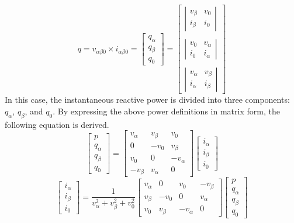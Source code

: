  \begin{equation}
 q=v_{\alpha \beta 0} \times i_{\alpha \beta 0} = \begin{bmatrix} q_\alpha \\ q_\beta \\ q_0 \end{bmatrix} =  \begin{bmatrix} \left| \begin{array}{cc} v_\beta & v_0 \\  i_\beta & i_0\end{array}\right| \\ \\ \left| \begin{array}{cc} v_0 & v_\alpha \\ i_0 & i_\alpha \end{array}\right| \\ \\ \left| \begin{array}{cc} v_\alpha & v_\beta \\ i_\alpha & i_\beta \end{array}\right| \end{bmatrix}
\label{eqn2.21}
\end{equation}
In this case, the instantaneous reactive power is divided into three components: $q_\alpha$, $q_\beta$, and $q_0$. By expressing the above power definitions in matrix form, the following equation is derived. 
 \begin{equation}
\begin{bmatrix} p \\q_\alpha  \\
q_{\beta} \\ q_0
\end{bmatrix} = \begin{bmatrix} v_\alpha & v_\beta & v_0 \\ 0 & -v_0 & v_\beta \\ v_0 & 0 & -v_\alpha \\ -v_\beta & v_\alpha & 0 
\end{bmatrix} \begin{bmatrix} i_\alpha \\ i_\beta \\ i_0
 \end{bmatrix}
\label{eqn2.22}
\end{equation}
 \begin{equation}
\begin{bmatrix} i_\alpha \\ i_\beta \\ i_0
\end{bmatrix}  = \frac{1}{v_\alpha^2 + v_\beta^2 + v_0^2} \begin{bmatrix} v_\alpha & 0 & v_0 & -v_\beta \\ v_\beta & -v_0 & 0 & v_\alpha \\ v_0 & v_\beta & -v_\alpha & 0  
\end{bmatrix} \begin{bmatrix} p \\ q_\alpha \\ q_\beta \\ q_0
 \end{bmatrix}
\label{eqn2.23}
\end{equation}
